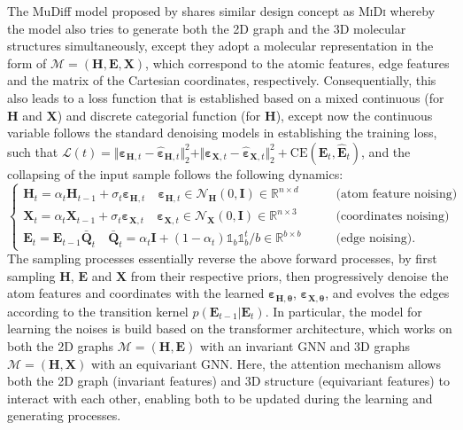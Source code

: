The MuDiff model proposed by \citet{hua2024mudiff} shares similar design concept as \textsc{MiDi} whereby the model also tries to generate both the 2D graph and the 3D molecular structures simultaneously, except they adopt a molecular representation in the form of $\mathcal{M}=(\bm{H},\bm{E},\bm{X})$, which correspond to the atomic features, edge features and the matrix of the Cartesian coordinates, respectively. Consequentially, this also leads to a loss function that is established based on a mixed continuous (for $\bm{H}$ and $\bm{X}$) and discrete categorial function (for $\bm{H}$), except now the continuous variable follows the standard denoising models in establishing the training loss, such that $\mathcal{L}(t)=\Vert \boldsymbol{\varepsilon}_{\bm{H},t}- \hat{\boldsymbol{\varepsilon}}_{\bm{H},t}\Vert_2^2 +\Vert \boldsymbol{\varepsilon}_{\bm{X},t}- \hat{\boldsymbol{\varepsilon}}_{\bm{X},t}\Vert_2^2+\mbox{CE}(\bm{E}_t,\hat{\bm{E}}_t)$, and the collapsing of the input sample follows the following dynamics:
\begin{equation*}
    \begin{cases}
        \bm{H}_t=\alpha_t \bm{H}_{t-1}+\sigma_t \boldsymbol{\varepsilon}_{\bm{H},t}\quad \boldsymbol{\varepsilon}_{\bm{H},t}\in\mathcal{N}_{\bm{H}}(0,\bm{I})\in\mathbb{R}^{n\times d}\qquad &\mbox{(atom feature noising)}\\
        \bm{X}_t=\alpha_t \bm{X}_{t-1}+\sigma_t \boldsymbol{\varepsilon}_{\bm{X},t}\quad \boldsymbol{\varepsilon}_{\bm{X},t}\in\mathcal{N}_{\bm{X}}(0,\bm{I})\in\mathbb{R}^{n\times 3}\qquad &\mbox{(coordinates noising)}\\
        \bm{E}_{t}=\bm{E}_{t-1}\bar{\bm{Q}}_t\quad \bar{\bm{Q}}_t=\alpha_t\bm{I}+(1-\alpha_t)\mathds{1}_b\mathds{1}_b^t/b\in\mathbb{R}^{b\times b}\qquad &\mbox{(edge noising)}.
    \end{cases}
\end{equation*}
The  sampling processes essentially reverse the above forward processes, by first sampling $\bm{H}$, $\bm{E}$ and $\bm{X}$ from their respective priors, then progressively denoise the atom features and coordinates with the learned $\boldsymbol{\varepsilon}_{\bm{H},\boldsymbol{\theta}}$, $\boldsymbol{\varepsilon}_{\bm{X},\boldsymbol{\theta}}$, and evolves the edges according to the transition kernel $p(\bm{E}_{t-1}|\bm{E}_t)$. In particular, the model for learning the noises is build based on the transformer\cite{vaswani2017attention} architecture, which works on both the 2D graphs $\mathcal{M}=(\bm{H},\bm{E})$ with an invariant GNN and 3D graphs $\mathcal{M}=(\bm{H},\bm{X})$ with an equivariant GNN. Here, the attention mechanism allows both the 2D graph (invariant features) and 3D structure (equivariant features) to interact with each other, enabling both to be updated during the learning and generating processes. 

